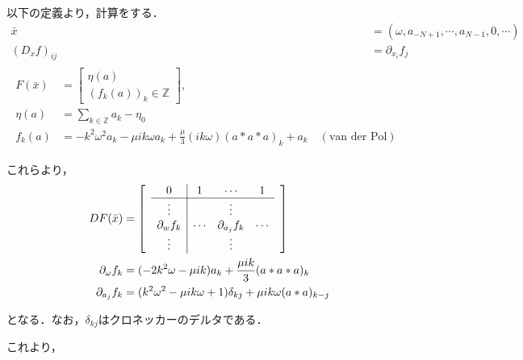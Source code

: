 \documentclass[11pt,a4paper,titlepage]{jsreport}
\theoremstyle{definition}
\begin{document}
以下の定義より，計算をする．
\begin{align}
  \bar{x} &= \left( \omega, a_{-N+1}, \cdots, a_{N-1}, 0, \cdots \right) \\
  (D_xf)_{ij} &= \partial_{x_i} f_j \\
  \begin{split}
    F(\bar{x}) &= \begin{bmatrix}
      \eta(a) \\
      (f_k(a))_k\in \mathbb{Z}
    \end{bmatrix}, \\
    \eta(a) &= \sum_{k\in\mathbb{Z}} a_k - \eta_0 \\
    f_k(a) &= -k^2\omega^2a_k - \mu i k \omega a_k + \frac{\mu}{3}(ik\omega)(a*a*a)_k + a_k\quad (\text{van der Pol})
  \end{split}
\end{align}

これらより，
\begin{equation*}
  \begin{split}
    DF(\bar{x}) &=
    \begin{bmatrix}
       & \multicolumn{1}{c|}{0} & 1  & \cdots & 1  & \\ \cline{2-5}
       & \multicolumn{1}{c|}{\vdots} & & \vdots & &  \\
       & \multicolumn{1}{c|}{\partial_w f_k} & \cdots & \partial_{a_j}f_k & \cdots & \\
       & \multicolumn{1}{c|}{\vdots} & & \vdots & &
    \end{bmatrix}\\
    \partial_\omega f_k &= (-2k^2\omega-\mu ik)a_k + \frac{\mu ik}{3} (a*a*a)_k \\
    \partial_{a_j} f_k &= (k^2\omega^2-\mu ik\omega +1)\delta_{kj} + \mu ik \omega (a*a)_{k-j}
  \end{split}
\end{equation*}

となる．なお，$\delta_{kj}$はクロネッカーのデルタである．

これより，
\end{document}
